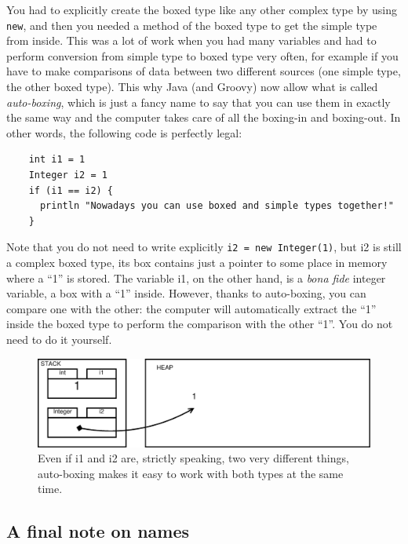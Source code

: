 You had to explicitly create the boxed type like any other complex
type by using \verb+new+, and then you needed a method of the boxed
type to get the simple type from inside. This was a lot of work when
you had many variables and had to perform conversion from
simple type to boxed type very often, for example if you have to make
comparisons of data between two different sources (one simple type,
the other boxed type). This why Java (and Groovy) now
allow what is called \emph{auto-boxing}, which is just a fancy name to
say that you can use them in exactly the same way and the computer
takes care of all the boxing-in and boxing-out. In other words, the
following code is perfectly legal: 

\begin{verbatim}
    int i1 = 1
    Integer i2 = 1
    if (i1 == i2) {
      println "Nowadays you can use boxed and simple types together!"
    }
\end{verbatim}

Note that you do not need to write 
explicitly \verb+i2 = new Integer(1)+, but i2 is still a complex boxed
type, its box contains just a pointer to some place in memory where a
``1'' is stored. The variable i1, on the other hand, is a \emph{bona
  fide} integer variable, a box with a ``1'' inside. However, thanks
to auto-boxing, you can compare one with the other: the computer will
automatically extract the ``1'' inside the boxed type to perform the
comparison with the other ``1''. You do not need to do it yourself. 

\begin{figure}[htbp]
  \centering
  \includegraphics[width=\textwidth]{gfx/variables-integer}
  \caption{Even if i1 and i2 are, strictly speaking, two very
    different things, auto-boxing makes it easy to work with both types
  at the same time.}
  \label{fig:integervars}
\end{figure}

\subsection{A final note on names}
\label{sec:final-note-name}

